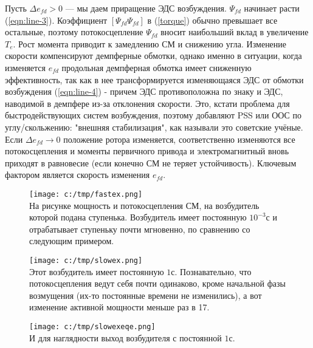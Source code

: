 \documentclass[lettersize,journal]{IEEEtran}
\begin{document}
	Пусть \(\Delta e_{fd} > 0\) --- мы даем приращение ЭДС возбуждения. \(\Psi_{fd}\) начинает расти (\ref{eqn:line-3}). Коэффициент \([\Psi_{fd}\Psi_{fd}]\) в (\ref{torque}) обычно превышает все остальные, поэтому потокосцепление \(\Psi_{fd}\) вносит наибольший вклад в увеличение \(T_e\). Рост момента приводит к замедлению СМ и снижению угла. Изменение скорости компенсируют демпферные обмотки, однако именно в ситуации, когда изменяется \(e_{fd}\) продольная демпферная обмотка имеет сниженную эффективность, так как в нее трансформируется изменяющаяся ЭДС от обмотки возбуждения (\ref{eqn:line-4}) - причем ЭДС противоположна по знаку и ЭДС, наводимой в демпфере из-за отклонения скорости. Это, кстати проблема для быстродействующих систем возбуждения, поэтому добавляют PSS или ООС по углу/скольжению: "внешняя стабилизация", как называли это советские учёные. Если \(\Delta e_{fd} \rightarrow 0\) положение ротора изменяется, соответственно изменяются все потокосцепления и моменты первичного привода и электромагнитный вновь приходят в равновесие (если конечно СМ не теряет устойчивость). Ключевым фактором является скорость изменения \(e_{fd}\).
	
	\begin{figure}[h]	
		\centering
		\texttt{[image: c:/tmp/fastex.png]} \\
			На рисунке мощность и потокосцепления СМ, на возбудитель которой подана ступенька. Возбудитель имеет постоянную \(10^{-3}\)с и отрабатывает ступеньку почти мгновенно, по сравнению со следующим примером.
	\end{figure}

	\begin{figure}[h]	
	\centering
	\texttt{[image: c:/tmp/slowex.png]} \\
	Этот возбудитель имеет постоянную \(1\)с. Познавательно, что потокосцепления ведут себя почти одинаково, кроме начальной фазы возмущения (их-то постоянные времени не изменились), а вот изменение активной мощности меньше раз в 17.
	\end{figure}
	
	\begin{figure}[h]	
		\centering
		\texttt{[image: c:/tmp/slowexeqe.png]} \\
		И для наглядности выход возбудителя с постоянной \(1\)с.
	\end{figure}
\end{document}
